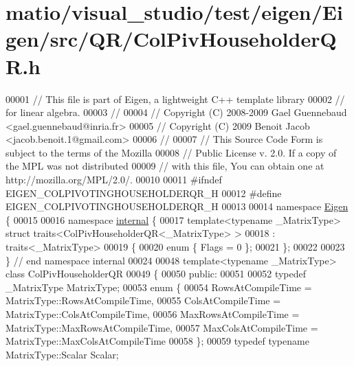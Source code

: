 \hypertarget{matio_2visual__studio_2test_2eigen_2_eigen_2src_2_q_r_2_col_piv_householder_q_r_8h_source}{}\section{matio/visual\+\_\+studio/test/eigen/\+Eigen/src/\+Q\+R/\+Col\+Piv\+Householder\+QR.h}
\label{matio_2visual__studio_2test_2eigen_2_eigen_2src_2_q_r_2_col_piv_householder_q_r_8h_source}

\begin{DoxyCode}
00001 \textcolor{comment}{// This file is part of Eigen, a lightweight C++ template library}
00002 \textcolor{comment}{// for linear algebra.}
00003 \textcolor{comment}{//}
00004 \textcolor{comment}{// Copyright (C) 2008-2009 Gael Guennebaud <gael.guennebaud@inria.fr>}
00005 \textcolor{comment}{// Copyright (C) 2009 Benoit Jacob <jacob.benoit.1@gmail.com>}
00006 \textcolor{comment}{//}
00007 \textcolor{comment}{// This Source Code Form is subject to the terms of the Mozilla}
00008 \textcolor{comment}{// Public License v. 2.0. If a copy of the MPL was not distributed}
00009 \textcolor{comment}{// with this file, You can obtain one at http://mozilla.org/MPL/2.0/.}
00010 
00011 \textcolor{preprocessor}{#ifndef EIGEN\_COLPIVOTINGHOUSEHOLDERQR\_H}
00012 \textcolor{preprocessor}{#define EIGEN\_COLPIVOTINGHOUSEHOLDERQR\_H}
00013 
00014 \textcolor{keyword}{namespace }\hyperlink{namespace_eigen}{Eigen} \{
00015 
00016 \textcolor{keyword}{namespace }\hyperlink{namespaceinternal}{internal} \{
00017 \textcolor{keyword}{template}<\textcolor{keyword}{typename} \_MatrixType> \textcolor{keyword}{struct }traits<ColPivHouseholderQR<\_MatrixType> >
00018  : traits<\_MatrixType>
00019 \{
00020   \textcolor{keyword}{enum} \{ Flags = 0 \};
00021 \};
00022 
00023 \} \textcolor{comment}{// end namespace internal}
00024 
00048 \textcolor{keyword}{template}<\textcolor{keyword}{typename} \_MatrixType> \textcolor{keyword}{class }ColPivHouseholderQR
00049 \{
00050   \textcolor{keyword}{public}:
00051 
00052     \textcolor{keyword}{typedef} \_MatrixType MatrixType;
00053     \textcolor{keyword}{enum} \{
00054       RowsAtCompileTime = MatrixType::RowsAtCompileTime,
00055       ColsAtCompileTime = MatrixType::ColsAtCompileTime,
00056       MaxRowsAtCompileTime = MatrixType::MaxRowsAtCompileTime,
00057       MaxColsAtCompileTime = MatrixType::MaxColsAtCompileTime
00058     \};
00059     \textcolor{keyword}{typedef} \textcolor{keyword}{typename} MatrixType::Scalar Scalar;

\end{DoxyCode}
